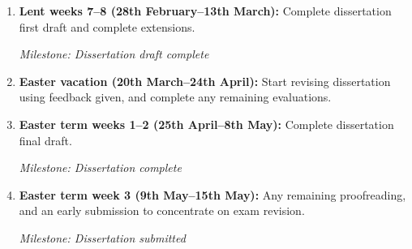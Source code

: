 \documentclass[12pt,a4paper,twoside]{article}
\begin{document}
\begin{enumerate}
    \item \textbf{Lent weeks 7--8 (28th February--13th March):} Complete dissertation first draft and complete extensions.

        \emph{Milestone: Dissertation draft complete}

    \item \textbf{Easter vacation (20th March--24th April):} Start revising dissertation using feedback given, and complete any remaining evaluations.

    \item \textbf{Easter term weeks 1--2 (25th April--8th May):} Complete dissertation final draft.

        \emph{Milestone: Dissertation complete}

    \item \textbf{Easter term week 3 (9th May--15th May):} Any remaining proofreading, and an early submission to concentrate on exam revision.

        \emph{Milestone: Dissertation submitted}

\end{enumerate}
\end{document}
